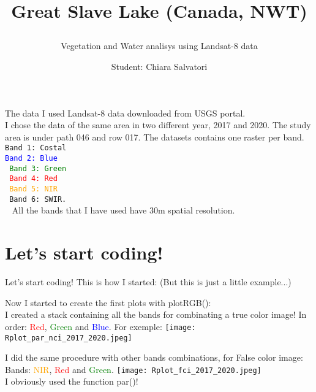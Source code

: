 \documentclass{beamer}
\title{{Great Slave Lake (Canada, NWT)}
\subtitle{{Vegetation and Water analisys using Landsat-8 data}}
}
\date{}
\author{\footnotesize{Student: Chiara Salvatori}}
\institute{
 Exam: Telerilevamento Geo-Ecologico.
 
    Professore: Duccio Rocchini
    \\
 \smallskip
 \texttt{[image: great\_slave\_lake\_intro.jpg]}
}
\begin{document}
\maketitle
\begin{frame}{The data}
    I used Landsat-8 data downloaded from USGS portal. \\ I chose the data of the same area in two different year, 2017 and 2020. The study area is under path 046 and row 017. The datasets contains one raster per band. \\ 
    \bigskip
    \texttt{\small{Band 1: Costal\\
    \textcolor{blue}{Band 2: Blue\\}
    \textcolor{green}{Band 3: Green\\}
    \textcolor{red}{Band 4: Red\\}
    \textcolor{orange}{Band 5: NIR\\}
    Band 6: SWIR. \\}
    }
    \bigskip
    All the bands that I have used have 30m spatial resolution.
\end{frame}

\section{Let's start coding!}
\begin{frame}{Let's start coding!}
 This is how I started: 
 (But this is just a little example...)
 \bigskip
    \texttt{\scriptsize{}}
    \
\end{frame}

\begin{frame}%
 Now I started to create the first plots with plotRGB():\\
 I created a stack containing all the bands for combinating a true color image! In order: \textcolor{red}{Red}, \textcolor{green}{Green} and \textcolor{blue}{Blue}.
 For exemple: 
    \texttt{\scriptsize{}}
    \texttt{[image: Rplot\_par\_nci\_2017\_2020.jpeg]}\\
\end{frame}

\begin{frame}%
 I did the same procedure with other bands combinations, for False color image:  Bands: \textcolor{orange}{NIR}, \textcolor{red}{Red} and \textcolor{green}{Green}.
    \texttt{\scriptsize{}}
    \texttt{[image: Rplot\_fci\_2017\_2020.jpeg]}\\
    I obviously used the function par()!
\end{frame}
\end{document}

